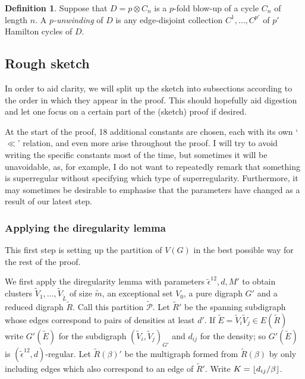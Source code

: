 \documentclass[10pt,letterpaper, reqno]{amsart}
\theoremstyle{definition}
\newtheorem{defn}[thm]{Definition}
\numberwithin{equation}{section}
\DeclarePairedDelimiter\floor{\lfloor}{\rfloor}
\begin{document}
\begin{defn}
	Suppose that $D = p \otimes C_n$ is a $p$-fold blow-up of a cycle $C_n$ of length $n$. A \textit{$p$-unwinding} of $D$ is any edge-disjoint collection $C^1, \dots, C^{p'}$ of $p'$ Hamilton cycles of $D$. 
\end{defn}

\subsection{Rough sketch}
In order to aid clarity, we will split up the sketch into subsections according to the order in which they appear in the proof. This should hopefully aid digestion and let one focus on a certain part of the (sketch) proof if desired.

At the start of the proof, 18 additional constants are chosen, each with its own `$\ll$' relation, and even more arise throughout the proof. I will try to avoid writing the specific constants most of the time, but sometimes it will be unavoidable, as, for example, I do not want to repeatedly remark that something is superregular without specifying which type of superregularity. Furthermore, it may sometimes be desirable to emphasise that the parameters have changed as a result of our latest step. 

\subsubsection{Applying the diregularity lemma} This first step is setting up the partition of $V(G)$ in the best possible way for the rest of the proof. 

We first apply the diregularity lemma with parameters $\tilde{\epsilon}^{12},d,M'$ to obtain clusters $\tilde{V}_1, \dots, \tilde{V}_{\tilde{L}}$ of size $\tilde{m}$, an exceptional set $V_0$, a pure digraph $G'$ and a reduced digraph $\tilde{R}$. Call this partition $\tilde{\mathcal{P}}$. Let $\tilde{R}'$ be the spanning subdigraph whose edges correspond to pairs of densities at least $d'$. If $\tilde{E} = \tilde{V}_i \tilde{V}_j \in E(\tilde{R})$ write $G'(\tilde{E})$ for the subdigraph $(\tilde{V}_i, \tilde{V}_j)_{G'}$ and $d_{ij}$ for the density; so $G'(\tilde{E})$ is $(\tilde{\epsilon}^{12},d)$-regular. Let $\tilde{R}(\beta)'$ be the multigraph formed from $\tilde{R}(\beta)$ by only including edges which also correspond to an edge of $\tilde{R}'$. Write $K=\floor{d_{ij}/\beta}$. 
\end{document}
